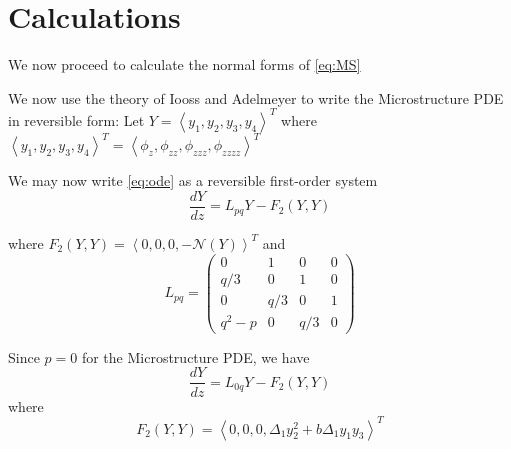 \section{Calculations}

We now proceed to calculate the normal forms of \eqref{eq:MS}


We now use the theory of Iooss and Adelmeyer \cite{IA} to write the Microstructure PDE in reversible form:
Let $Y=\left<y_1,y_2,y_3,y_4\right>^T$ where $\left<y_1,y_2,y_3,y_4\right>^T = \left<\phi_z,\phi_{zz}, \phi_{zzz}, \phi_{zzzz} \right>^T $

We may now write \eqref{eq:ode} as a reversible first-order system 
\begin{equation}\frac{ dY }{ dz } = L_{pq} Y - F_2(Y,Y) \end{equation}

where $F_2(Y,Y) = \left<0,0,0,-\mathcal{N}(Y)\right>^T $ and 
\begin{equation}
L_{pq} = \left( 
\begin{array}{cccc}
0&1&0&0\\
q/3&0&1&0\\
0&q/3&0&1\\
q^2 - p &0&q/3&0 \end{array} \right) \end{equation}

Since $p=0$ for the Microstructure PDE, we have 
\begin{equation} 
 \frac{ dY }{ dz } = L_{0q} Y - F_2(Y,Y) 
\end{equation}
where 
\begin{equation}
F_2(Y,Y) = \left<0,0,0,\Delta_1 y_2^2 + b \Delta_1 y_1 y_3 \right>^T
\end{equation}




